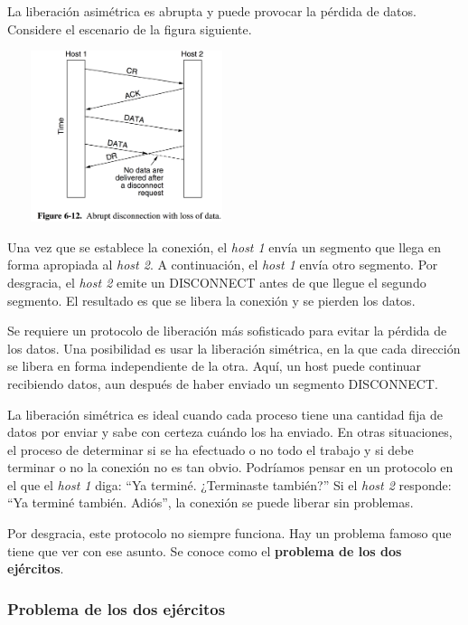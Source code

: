 \documentclass[10pt,a4paper]{report}
\begin{document}
	\par La liberación asimétrica es abrupta y puede provocar la pérdida de datos. Considere el escenario de la figura siguiente.
	
	\begin{center}
		\includegraphics[width=7cm, height=5cm]{./imagenes/liberacion.png}
	\end{center}
	
	\par Una vez que se establece la conexión, el \textit{host 1} envía un segmento que llega en forma apropiada al \textit{host 2}. A continuación, el \textit{host 1} envía otro segmento. Por desgracia, el \textit{host 2} emite un DISCONNECT antes de que llegue el segundo segmento. El resultado es que se libera la conexión y se pierden los datos.

	\par Se requiere un protocolo de liberación más sofisticado para evitar la pérdida de los datos. Una posibilidad es usar la liberación simétrica, en la que cada dirección se libera en forma independiente de la otra. Aquí, un host puede continuar recibiendo datos, aun después de haber enviado un segmento DISCONNECT.

	\par La liberación simétrica es ideal cuando cada proceso tiene una cantidad fija de datos por enviar y sabe con certeza cuándo los ha enviado. En otras situaciones, el proceso de determinar si se ha efectuado o no todo el trabajo y si debe terminar o no la conexión no es tan obvio. Podríamos pensar en un protocolo en el que el \textit{host 1} diga: “Ya terminé. ¿Terminaste también?” Si el \textit{host 2} responde: “Ya terminé también. Adiós”, la conexión se puede liberar sin problemas.

	\par Por desgracia, este protocolo no siempre funciona. Hay un problema famoso que tiene que ver con ese asunto. Se conoce como el \textbf{problema de los dos ejércitos}.

\subsubsection{Problema de los dos ejércitos}
\end{document}
